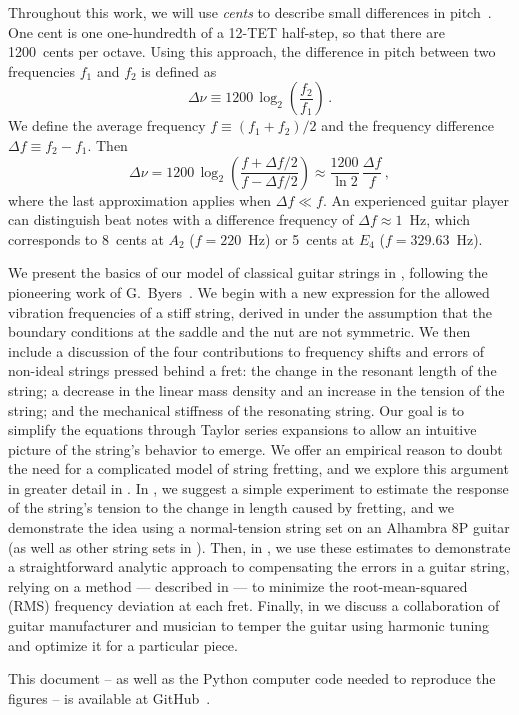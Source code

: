 Throughout this work, we will use \emph{cents} to describe small differences in pitch~\cite{ref:durfee2015pms}. One cent is one one-hundredth of a 12-TET half-step, so that there are 1200~cents per octave. Using this approach, the difference in pitch between two frequencies $f_1$ and $f_2$ is defined as
 \begin{equation} \label{eqn:cents_def}
\Delta \nu \equiv 1200\, \log_2\left(\frac{f_2}{f_1}\right)\, .
 \end{equation}
We define the average frequency $f \equiv (f_1 + f_2) / 2$ and the frequency difference $\Delta f \equiv f_2 - f_1$. Then
 \begin{equation} \label{eqn:cents_approx}
\Delta \nu = 1200\, \log_2\left(\frac{f + \Delta f / 2}{f - \Delta f /2}\right) \approx \frac{1200}{\ln 2}\, \frac{\Delta f}{f}\, ,
 \end{equation}
where the last approximation applies when $\Delta f \ll f$. An experienced guitar player can distinguish beat notes with a difference frequency of $\Delta f \approx 1$~Hz, which corresponds to 8~cents at $A_2$ ($f = 220$~Hz) or 5~cents at $E_4$ ($f = 329.63$~Hz).

We present the basics of our model of classical guitar strings in , following the pioneering work of G.\ Byers~\cite{ref:byers1996cgi,ref:byersweb}. We begin with a new expression for the allowed vibration frequencies of a stiff string, derived in  under the assumption that the boundary conditions at the saddle and the nut are not symmetric. We then include a discussion of the four contributions to frequency shifts and errors of non-ideal strings pressed behind a fret: the change in the resonant length of the string; a decrease in the linear mass density and an increase in the tension of the string; and the mechanical stiffness of the resonating string. Our goal is to simplify the equations through Taylor series expansions to allow an intuitive picture of the string's behavior to emerge. We offer an empirical reason to doubt the need for a complicated model of string fretting, and we explore this argument in greater detail in . In , we suggest a simple experiment to estimate the response of the string's tension to the change in length caused by fretting, and we demonstrate the idea using a normal-tension string set on an Alhambra 8P guitar (as well as other string sets in ). Then, in , we use these estimates to demonstrate a straightforward analytic approach to compensating the errors in a guitar string, relying on a method --- described in  --- to minimize the root-mean-squared (RMS) frequency deviation at each fret. Finally, in  we discuss a collaboration of guitar manufacturer and musician to temper the guitar using harmonic tuning and optimize it for a particular piece.

This document -- as well as the Python computer code needed to reproduce the figures -- is available at GitHub~\cite{ref:github2021rgb}. 